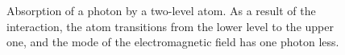 \begin{figure}
\centering



\caption{Absorption of a photon by a two-level atom. As a result
  of the interaction, the atom transitions from the lower level to the upper one, and the mode
  of the electromagnetic field has one photon less.}
\label{figPart1Ch2_3}
\end{figure}